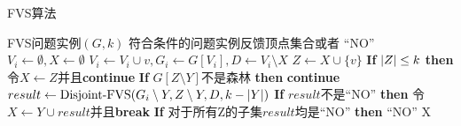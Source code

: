 \begin{algorithm}
\caption{FVS算法}
\begin{algorithmic}[1]
\Require FVS问题实例$(G,k)$
\Ensure  符合条件的问题实例反馈顶点集合或者 “NO”
\algrule
{}
    \State $V_i \gets \emptyset, X \gets \emptyset$
        \State $V_i \gets V_i \cup v, G_i \gets G[V_i], D \gets V_i \setminus X$
        \State $Z \gets X \cup \{v\}$
        \State \textbf{If} $\left\vert Z \right\vert \le k$ \textbf{then} 令$X \gets Z$并且\textbf{continue}
            \State \textbf{If} $G[Z \setminus Y]$不是森林 \textbf{then} \textbf{continue}
            \State $result \gets \text{Disjoint-FVS}(G_i \setminus Y, Z \setminus Y, D, k - \left\vert Y \right\vert)$
            \State \textbf{If} $result$不是“NO” \textbf{then} 令$X \gets Y \cup result$并且\textbf{break}
        \EndFor
        \State \textbf{If} 对于所有Z的子集$result$均是“NO” \textbf{then} \Return “NO”
    \EndFor
    \State \Return X
\EndFunction
\end{algorithmic}
\end{algorithm} 
